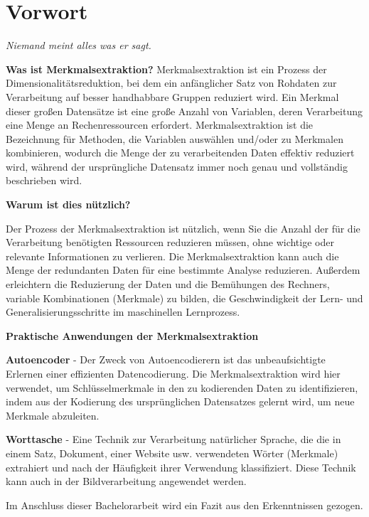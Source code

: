 \chapter*{Vorwort}
\thispagestyle{empty}

\begin{displayquote}
\textit{Niemand meint alles was er sagt.}
\end{displayquote}

\textbf{Was ist Merkmalsextraktion?}
Merkmalsextraktion ist ein Prozess der Dimensionalitätsreduktion, bei dem ein anfänglicher Satz von Rohdaten zur Verarbeitung auf besser handhabbare Gruppen reduziert wird. Ein Merkmal dieser großen Datensätze ist eine große Anzahl von Variablen, deren Verarbeitung eine Menge an Rechenressourcen erfordert. Merkmalsextraktion ist die Bezeichnung für Methoden, die Variablen auswählen und/oder zu Merkmalen kombinieren, wodurch die Menge der zu verarbeitenden Daten effektiv reduziert wird, während der ursprüngliche Datensatz immer noch genau und vollständig beschrieben wird.

\noindent
\textbf{Warum ist dies nützlich?}

Der Prozess der Merkmalsextraktion ist nützlich, wenn Sie die Anzahl der für die Verarbeitung benötigten Ressourcen reduzieren müssen, ohne wichtige oder relevante Informationen zu verlieren. Die Merkmalsextraktion kann auch die Menge der redundanten Daten für eine bestimmte Analyse reduzieren. Außerdem erleichtern die Reduzierung der Daten und die Bemühungen des Rechners, variable Kombinationen (Merkmale) zu bilden, die Geschwindigkeit der Lern- und Generalisierungsschritte im maschinellen Lernprozess.

\textbf{Praktische Anwendungen der Merkmalsextraktion}

\textbf{Autoencoder}
- Der Zweck von Autoencodierern ist das unbeaufsichtigte Erlernen einer effizienten Datencodierung. Die Merkmalsextraktion wird hier verwendet, um Schlüsselmerkmale in den zu kodierenden Daten zu identifizieren, indem aus der Kodierung des ursprünglichen Datensatzes gelernt wird, um neue Merkmale abzuleiten.

\textbf{Worttasche}
- Eine Technik zur Verarbeitung natürlicher Sprache, die die in einem Satz, Dokument, einer Website usw. verwendeten Wörter (Merkmale) extrahiert und nach der Häufigkeit ihrer Verwendung klassifiziert. Diese Technik kann auch in der Bildverarbeitung angewendet werden.

Im Anschluss dieser Bachelorarbeit wird ein Fazit aus den Erkenntnissen gezogen.

